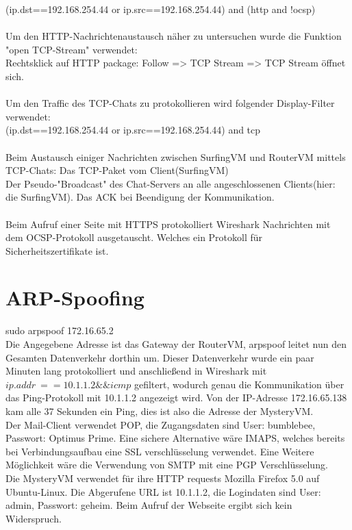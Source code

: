 \documentclass[12pt]{article}
\theoremstyle{plain}
\begin{document}
(ip.dst==192.168.254.44 or ip.src==192.168.254.44) and (http and !ocsp)\\ \\
Um den HTTP-Nachrichtenaustausch näher zu untersuchen wurde die Funktion "open TCP-Stream" verwendet: \\
Rechtsklick auf HTTP package: Follow => TCP Stream => TCP Stream öffnet sich.
\\\\
Um den Traffic des TCP-Chats zu protokollieren wird folgender Display-Filter verwendet: \\
(ip.dst==192.168.254.44 or ip.src==192.168.254.44) and tcp\\\\
Beim Austausch einiger Nachrichten zwischen SurfingVM und RouterVM mittels TCP-Chats:
Das TCP-Paket vom Client(SurfingVM)\\
Der Pseudo-"Broadcast" des Chat-Servers an alle angeschlossenen Clients(hier: die SurfingVM).
Das ACK bei Beendigung der Kommunikation.
\\\\
Beim Aufruf einer Seite mit HTTPS protokolliert Wireshark Nachrichten mit dem OCSP-Protokoll ausgetauscht. Welches ein Protokoll für Sicherheitszertifikate ist.
\section{ARP-Spoofing}
sudo arpspoof 172.16.65.2\\
Die Angegebene Adresse ist das Gateway der RouterVM, arpspoof leitet nun den Gesamten Datenverkehr dorthin um.
Dieser Datenverkehr wurde ein paar Minuten lang protokolliert und anschließend in Wireshark mit $ip.addr\ == 10.1.1.2 \&\& icmp$ gefiltert, wodurch genau die Kommunikation über das Ping-Protokoll mit 10.1.1.2 angezeigt wird. Von der IP-Adresse 172.16.65.138 kam alle 37 Sekunden ein Ping, dies ist also die Adresse der MysteryVM.\\
Der Mail-Client verwendet POP, die Zugangsdaten sind User: bumblebee, Passwort: Optimus Prime. Eine sichere Alternative wäre IMAPS, welches bereits bei Verbindungsaufbau eine SSL verschlüsselung verwendet. Eine Weitere Möglichkeit wäre die Verwendung von SMTP mit eine PGP Verschlüsselung.\\
Die MysteryVM verwendet für ihre HTTP requests Mozilla Firefox 5.0 auf Ubuntu-Linux. Die Abgerufene URL ist 10.1.1.2, die Logindaten sind User: admin, Passwort: geheim. Beim Aufruf der Webseite ergibt sich kein Widerspruch.
\end{document}
